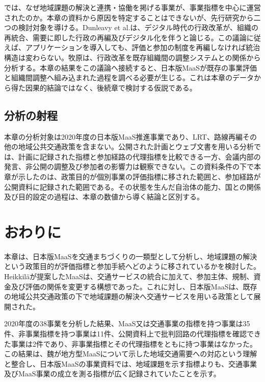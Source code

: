 では、なぜ地域課題の解決と連携・協働を掲げる事業が、事業指標を中心に運営されたのか。本章の資料から原因を特定することはできないが、先行研究から二つの検討対象を導ける。Dunleavy et al.は、デジタル時代の行政改革が、組織の再統合、需要に即した行政の再編及びデジタル化を伴うと論じる\cite{dunleavy2006}。この議論に従えば、アプリケーションを導入しても、評価と参加の制度を再編しなければ統治構造は変わらない。牧原は、行政改革を既存組織間の調整システムとの関係から分析する\cite{makihara2007}。本章の結果をこの議論へ接続すると、日本版MaaSが既存の事業評価と組織間調整へ組み込まれた過程を調べる必要が生じる。これは本章のデータから得た因果的結論ではなく、後続章で検討する仮説である。

\subsection{分析の射程}
\label{subsec:ch4_limitations}

本章の分析対象は2020年度の日本版MaaS推進事業であり、LRT、路線再編その他の地域公共交通政策を含まない。公開された計画とウェブ文書を用いる分析では、計画に記録された指標と参加経路の代理指標を比較できる一方、会議内部の発言、非公開の調整及び参加者の影響力は観察できない。この資料条件の下で本章が示したのは、政策目的が個別事業の評価指標に移された範囲と、参加経路が公開資料に記録された範囲である。その状態を生んだ自治体の能力、国との関係及び目的設定の過程は、本章の数値から導く結論と区別する。

\section{おわりに}
\label{sec:ch4_conclusion}

本章は、日本版MaaSを交通まちづくりの一類型として分析し、地域課題の解決という政策目的が評価指標と参加手続へどのように移されているかを検討した。Heikkiläが提案したMaaSは、交通サービスの統合に加えて、参加主体、規制、資金及び評価の関係を変更する構想であった。これに対し、日本版MaaSは、既存の地域公共交通政策の下で地域課題の解決へ交通サービスを用いる政策として展開された。

2020年度の38事業を分析した結果、MaaS又は交通事業の指標を持つ事業は35件、非事業指標を持つ事業は11件、公開資料上で批判回路の代理指標を確認できた事業は2件であり、非事業指標とその代理指標をともに持つ事業はなかった。この結果は、魏が地方型MaaSについて示した地域交通需要への対応という理解\cite{weishunan2022}と整合し、日本版MaaSの事業資料では、地域課題を示す指標よりも、交通事業及びMaaS事業の成立を測る指標が広く記録されていたことを示す。


